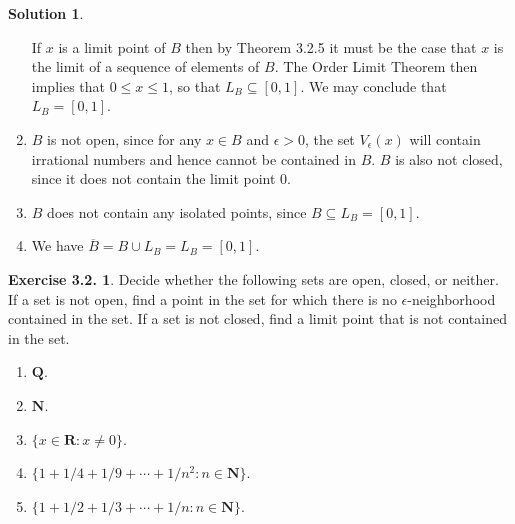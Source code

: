 \documentclass[12pt]{article}
\theoremstyle{definition}
\theoremstyle{exercise}
\newtheorem{exercise}{Exercise 3.2.}
\theoremstyle{solution}
\newtheorem*{solution}{Solution}
\newcommand{\N}{\mathbf{N}}
\newcommand{\Q}{\mathbf{Q}}
\newcommand{\R}{\mathbf{R}}
\begin{document}
\begin{solution}
\begin{enumerate}
        If \( x \) is a limit point of \( B \) then by Theorem 3.2.5 it must be the case that \( x \) is the limit of a sequence of elements of \( B \). The Order Limit Theorem then implies that \( 0 \leq x \leq 1 \), so that \( L_B \subseteq [0, 1] \). We may conclude that \( L_B = [0, 1] \).

        \item \( B \) is not open, since for any \( x \in B \) and \( \epsilon > 0 \), the set \( V_{\epsilon}(x) \) will contain irrational numbers and hence cannot be contained in \( B \). \( B \) is also not closed, since it does not contain the limit point \( 0 \).

        \item \( B \) does not contain any isolated points, since \( B \subseteq L_B = [0, 1] \).

        \item We have \( \overline{B} = B \cup L_B = L_B = [0, 1] \).
    \end{enumerate}
\end{solution}

\begin{exercise}
\label{ex:3}
    Decide whether the following sets are open, closed, or neither. If a set is not open, find a point in the set for which there is no \( \epsilon \)-neighborhood contained in the set. If a set is not closed, find a limit point that is not contained in the set.
    \begin{enumerate}
        \item \( \Q \).

        \item \( \N \).

        \item \( \{ x \in \R : x \neq 0 \} \).

        \item \( \{ 1 + 1/4 + 1/9 + \cdots + 1/n^2 : n \in \N \} \).

        \item \( \{ 1 + 1/2 + 1/3 + \cdots + 1/n : n \in \N \} \).
    \end{enumerate}
\end{exercise}
\end{document}

